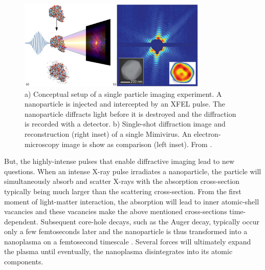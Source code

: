 \begin{figure}
	\centering
		\includegraphics[width=0.80\textwidth]{images/intro-dani.jpg}
	\caption[Conceptual setup of a single particle imaging experiment.]{a) Conceptual setup of a single particle imaging experiment. A nanoparticle is injected and intercepted by an XFEL pulse. The nanoparticle diffracts light before it is destroyed and the diffraction is recorded with a detector. b) Single-shot diffraction image and reconstruction (right inset) of a single Mimivirus. An electron-microscopy image is show as comparison  (left inset). From \cite{Rupp-2013-Thesis,Neutze-2000-Nature,Seibert-2011-Nature}.}
	\label{fig:spi-concept}
\end{figure}
%
But, the highly-intense pulses that enable diffractive imaging lead to new questions. When an intense X-ray pulse irradiates a nanoparticle, the particle will simultaneously absorb and scatter X-rays with the absorption cross-section typically being much larger than the scattering cross-section. From the first moment of light-matter interaction, the absorption will lead to inner atomic-shell vacancies \citep{Young-2010-Nature} and these vacancies make the above mentioned cross-sections time-dependent. Subsequent core-hole decays, such as the Auger decay, typically occur only a few femtoseconds later and the nanoparticle is thus transformed into a nanoplasma on a femtosecond timescale \cite{Bostedt-2012-PRL}. Several forces will ultimately expand the plasma \citep{Gorkhover-2016-NatPho,Ferguson-2016-SciAdv} until eventually, the nanoplasma disintegrates into its atomic components.\\[1\baselineskip]
%
